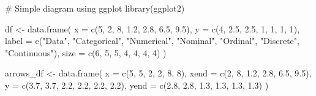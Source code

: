 \documentclass[
  12pt,
  letterpaper,
]{book}
\newenvironment{Shaded}{\begin{snugshade}}{\end{snugshade}}
\newcommand{\AttributeTok}[1]{\textcolor[rgb]{0.40,0.45,0.13}{#1}}
\newcommand{\CommentTok}[1]{\textcolor[rgb]{0.37,0.37,0.37}{#1}}
\newcommand{\DecValTok}[1]{\textcolor[rgb]{0.68,0.00,0.00}{#1}}
\newcommand{\FloatTok}[1]{\textcolor[rgb]{0.68,0.00,0.00}{#1}}
\newcommand{\FunctionTok}[1]{\textcolor[rgb]{0.28,0.35,0.67}{#1}}
\newcommand{\NormalTok}[1]{\textcolor[rgb]{0.00,0.23,0.31}{#1}}
\newcommand{\OtherTok}[1]{\textcolor[rgb]{0.00,0.23,0.31}{#1}}
\newcommand{\StringTok}[1]{\textcolor[rgb]{0.13,0.47,0.30}{#1}}
\begin{document}
\begin{Shaded}
\begin{Highlighting}[]
\CommentTok{\# Simple diagram using ggplot}
\FunctionTok{library}\NormalTok{(ggplot2)}

\NormalTok{df }\OtherTok{\textless{}{-}} \FunctionTok{data.frame}\NormalTok{(}
  \AttributeTok{x =}    \FunctionTok{c}\NormalTok{(}\DecValTok{5}\NormalTok{,   }\DecValTok{2}\NormalTok{,   }\DecValTok{8}\NormalTok{,   }\FloatTok{1.2}\NormalTok{, }\FloatTok{2.8}\NormalTok{,  }\FloatTok{6.5}\NormalTok{, }\FloatTok{9.5}\NormalTok{),}
  \AttributeTok{y =}    \FunctionTok{c}\NormalTok{(}\DecValTok{4}\NormalTok{,   }\FloatTok{2.5}\NormalTok{, }\FloatTok{2.5}\NormalTok{, }\DecValTok{1}\NormalTok{,   }\DecValTok{1}\NormalTok{,    }\DecValTok{1}\NormalTok{,   }\DecValTok{1}\NormalTok{),}
  \AttributeTok{label =} \FunctionTok{c}\NormalTok{(}\StringTok{"Data"}\NormalTok{,}
            \StringTok{"Categorical"}\NormalTok{,}
            \StringTok{"Numerical"}\NormalTok{,}
            \StringTok{"Nominal"}\NormalTok{,}
            \StringTok{"Ordinal"}\NormalTok{,}
            \StringTok{"Discrete"}\NormalTok{,}
            \StringTok{"Continuous"}\NormalTok{),}
  \AttributeTok{size =} \FunctionTok{c}\NormalTok{(}\DecValTok{6}\NormalTok{, }\DecValTok{5}\NormalTok{, }\DecValTok{5}\NormalTok{, }\DecValTok{4}\NormalTok{, }\DecValTok{4}\NormalTok{, }\DecValTok{4}\NormalTok{, }\DecValTok{4}\NormalTok{)}
\NormalTok{)}

\NormalTok{arrows\_df }\OtherTok{\textless{}{-}} \FunctionTok{data.frame}\NormalTok{(}
  \AttributeTok{x =}    \FunctionTok{c}\NormalTok{(}\DecValTok{5}\NormalTok{,   }\DecValTok{5}\NormalTok{,   }\DecValTok{2}\NormalTok{,   }\DecValTok{2}\NormalTok{,   }\DecValTok{8}\NormalTok{,   }\DecValTok{8}\NormalTok{),}
  \AttributeTok{xend =} \FunctionTok{c}\NormalTok{(}\DecValTok{2}\NormalTok{,   }\DecValTok{8}\NormalTok{,   }\FloatTok{1.2}\NormalTok{, }\FloatTok{2.8}\NormalTok{, }\FloatTok{6.5}\NormalTok{, }\FloatTok{9.5}\NormalTok{),}
  \AttributeTok{y =}    \FunctionTok{c}\NormalTok{(}\FloatTok{3.7}\NormalTok{, }\FloatTok{3.7}\NormalTok{, }\FloatTok{2.2}\NormalTok{, }\FloatTok{2.2}\NormalTok{, }\FloatTok{2.2}\NormalTok{, }\FloatTok{2.2}\NormalTok{),}
  \AttributeTok{yend =} \FunctionTok{c}\NormalTok{(}\FloatTok{2.8}\NormalTok{, }\FloatTok{2.8}\NormalTok{, }\FloatTok{1.3}\NormalTok{, }\FloatTok{1.3}\NormalTok{, }\FloatTok{1.3}\NormalTok{, }\FloatTok{1.3}\NormalTok{)}
\NormalTok{)}


\end{Highlighting}
\end{Shaded}
\end{document}
